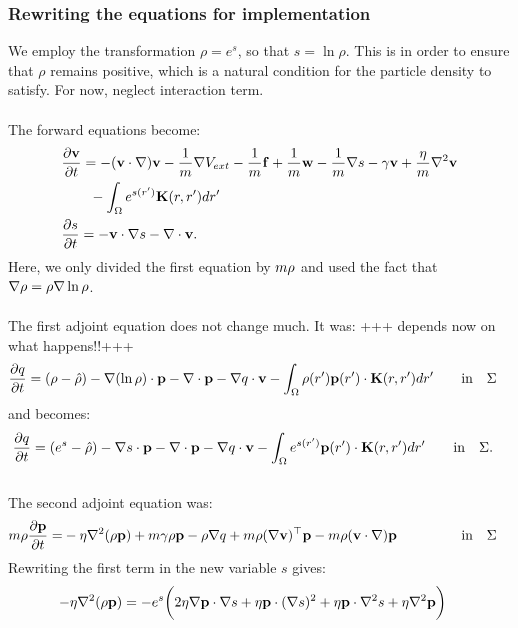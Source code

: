 \subsubsection{Rewriting the equations for implementation}
We employ the transformation $\rho = e^s$, so that $s = \ln \rho$. This is in order to ensure that $\rho$ remains positive, which is a natural condition for the particle density to satisfy. For now, neglect interaction term.
\\
\\
The forward equations become:
\begin{align}
& \frac{\partial \mathbf{v}}{\partial t}= -  (\mathbf{v} \cdot \nabla)\mathbf{v} - \frac{1}{m} \nabla V_{ext} -\frac{1}{m}\mathbf{f} +\frac{1}{m} \mathbf{w} - \frac{1}{m} \nabla s - \gamma \mathbf{v} +  \frac{\eta}{m} \nabla^2 \mathbf{v} \label{eqn:INreducedv1}\\
&\quad \quad  -\int_\Omega e^{s(r')} \mathbf{K}(r,r')dr'\\
 &\frac{\partial s}{\partial t} = - \mathbf{v} \cdot \nabla s - \nabla \cdot \mathbf{v} \label{eqn:INreducedrho1} .
\end{align}
Here, we only divided the first equation by $m \rho$ and used the fact that $\nabla \rho = \rho \nabla \ln \rho$.\\
\\
The first adjoint equation does not change much. It was: 
+++ depends now on what happens!!+++
\begin{align*}
& \frac{\partial q}{\partial t} = (\rho - \hat {\rho}) - \nabla (\ln \rho)\cdot \mathbf{p} -\nabla\cdot \mathbf{p}  -  \nabla q \cdot \mathbf{v}  - \int_\Omega  \rho(r')\mathbf{p}(r') \cdot\mathbf{K}(r,r')   dr' \qquad \text{in} \quad \Sigma 
\end{align*}
and becomes:
\begin{align*}
& \frac{\partial q}{\partial t} = (e^s - \hat {\rho}) - \nabla s \cdot \mathbf{p} -\nabla\cdot \mathbf{p}  -  \nabla q \cdot \mathbf{v}  - \int_\Omega  e^{s(r')}\mathbf{p}(r') \cdot\mathbf{K}(r,r')   dr' \qquad \text{in} \quad \Sigma. 
\end{align*}
\\
The second adjoint equation was:
\begin{align*}
m\rho \frac{\partial \mathbf{p}}{\partial t} =& - \eta \nabla^2 (\rho \mathbf{p})   +m \gamma \rho \mathbf{p}-\rho\nabla q +m \rho (\nabla \mathbf{v})^\top\mathbf{p} -m \rho (\mathbf{v} \cdot \nabla)\mathbf{p}   \ \qquad\qquad \  \text{in} \quad \Sigma
\end{align*}
Rewriting the first term in the new variable $s$ gives:
\begin{align*}
- \eta \nabla^2 (\rho \mathbf{p}) &= - e^s \bigg(2 \eta \nabla \mathbf{p} \cdot \nabla s + \eta \mathbf{p} \cdot (\nabla s)^2 + \eta \mathbf{p} \cdot \nabla^2 s + \eta \nabla^2 \mathbf{p}    \bigg)
\end{align*}
